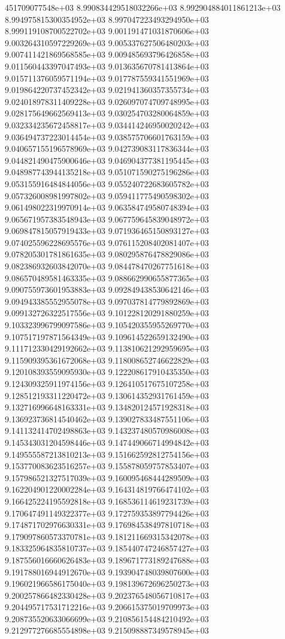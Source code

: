 451709077548e+03	8.990834429518032266e+03	8.992904884011861213e+03	8.994975815300354952e+03	8.997047223493294950e+03	8.999119108700522702e+03	9.001191471031870606e+03	9.003264310597229269e+03	9.005337627506480203e+03	9.007411421869568585e+03	9.009485693796426858e+03	9.011560443397047493e+03	9.013635670781413864e+03	9.015711376059571194e+03	9.017787559341551969e+03	9.019864220737452342e+03	9.021941360357355734e+03	9.024018978311409228e+03	9.026097074709748995e+03	9.028175649662569413e+03	9.030254703280064859e+03	9.032334235672458817e+03	9.034414246950020242e+03	9.036494737223014454e+03	9.038575706601763159e+03	9.040657155196578969e+03	9.042739083117836344e+03	9.044821490475900646e+03	9.046904377381195445e+03	9.048987743944135218e+03	9.051071590275196286e+03	9.053155916484844056e+03	9.055240722683605782e+03	9.057326008981997802e+03	9.059411775490598302e+03	9.061498022319970914e+03	9.063584749580748394e+03	9.065671957383548943e+03	9.067759645839048972e+03	9.069847815057919433e+03	9.071936465150893127e+03	9.074025596228695576e+03	9.076115208402081407e+03	9.078205301781861635e+03	9.080295876478829086e+03	9.082386932603842070e+03	9.084478470267751618e+03	9.086570489581463335e+03	9.088662990655877365e+03	9.090755973601953883e+03	9.092849438530642146e+03	9.094943385552955078e+03	9.097037814779892869e+03	9.099132726322517556e+03	9.101228120291880259e+03	9.103323996799097586e+03	9.105420355955269770e+03	9.107517197871564349e+03	9.109614522659132490e+03	9.111712330429192662e+03	9.113810621292959695e+03	9.115909395361672068e+03	9.118008652746622829e+03	9.120108393559095930e+03	9.122208617910435350e+03	9.124309325911974156e+03	9.126410517675107258e+03	9.128512193311220472e+03	9.130614352931761459e+03	9.132716996648163331e+03	9.134820124571928318e+03	9.136923736814540462e+03	9.139027833487551106e+03	9.141132414702498863e+03	9.143237480570986008e+03	9.145343031204598446e+03	9.147449066714994842e+03	9.149555587213810213e+03	9.151662592812754156e+03	9.153770083623516257e+03	9.155878059757853407e+03	9.157986521327517039e+03	9.160095468444289509e+03	9.162204901220002284e+03	9.164314819766474102e+03	9.166425224195592818e+03	9.168536114619231739e+03	9.170647491149322377e+03	9.172759353897794426e+03	9.174871702976630331e+03	9.176984538497810718e+03	9.179097860573370781e+03	9.181211669315342078e+03	9.183325964835810737e+03	9.185440747246857427e+03	9.187556016660626483e+03	9.189671773189247688e+03	9.191788016944912670e+03	9.193904748039807600e+03	9.196021966586175040e+03	9.198139672696250273e+03	9.200257866482330428e+03	9.202376548056710817e+03	9.204495717531712216e+03	9.206615375019709973e+03	9.208735520633066699e+03	9.210856154484210492e+03	9.212977276685554898e+03	9.215098887349578945e+03

